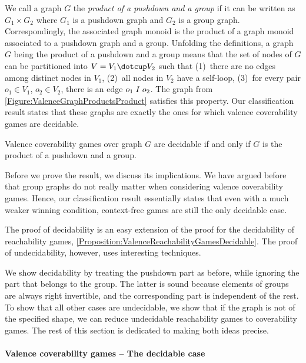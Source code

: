 \documentclass[../../diss.tex]{subfiles}
\begin{document}
We call a graph $G$ the \emph{product of a pushdown and a group} if it can be written as $G_1 \times G_2$ where $G_1$ is a pushdown graph and $G_2$ is a group graph.
Correspondingly, the associated graph monoid is the product of a graph monoid associated to a pushdown graph and a group.
Unfolding the definitions, a graph $G$ being the product of a pushdown and a group means that the set of nodes of $G$ can be partitioned into $V = V_1 \dotcup V_2$ such that
(1)~there are no edges among distinct nodes in $V_1$,
(2)~all nodes in $V_2$ have a self-loop,
(3)~for every pair $o_1 \in V_1$, $o_2 \in V_2$, there is an edge $o_1 \mathrel{I} o_2$.
The graph from \cref{Figure:ValenceGraphProductsProduct} satisfies this property.
Our classification result states that these graphs are exactly the ones for which valence coverability games are decidable.

\begin{theorem}%
\label{Theorem:ValenceCoverabilityGamesClassification}%
    Valence coverability games over graph $G$ are decidable if and only if $G$ is the product of a pushdown and a group.
\end{theorem}

Before we prove the result, we discuss its implications.
We have argued before that group graphs do not really matter when considering valence coverability games.
Hence, our classification result essentially states that even with a much weaker winning condition, context-free games are still the only decidable case.

The proof of decidability is an easy extension of the proof for the decidability of reachability games, \cref{Proposition:ValenceReachabilityGamesDecidable}.
The proof of undecidability, however, uses interesting techniques.

We show decidability by treating the pushdown part as before, while ignoring the part that belongs to the group.
The latter is sound because elements of groups are always right invertible, and the corresponding part is independent of the rest.
To show that all other cases are undecidable, we show that if the graph is not of the specified shape, we can reduce undecidable reachability games to coverability games.
The rest of this section is dedicated to making both ideas precise.

\paragraph{Valence coverability games -- The decidable case}
\end{document}
